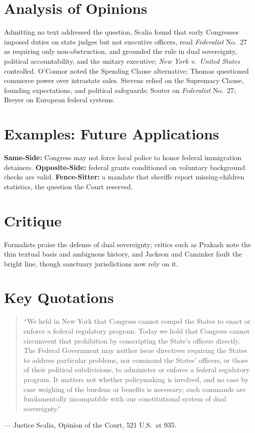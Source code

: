 \documentclass[12pt]{article}
\begin{document}
\section{Analysis of Opinions}
Admitting no text addressed the question, Scalia found that early Congresses imposed duties on state judges but not executive officers, read \textit{Federalist} No.\ 27 as requiring only non-obstruction, and grounded the rule in dual sovereignty, political accountability, and the unitary executive; \textit{New York v.\ United States} controlled. O'Connor noted the Spending Clause alternative; Thomas questioned commerce power over intrastate sales. Stevens relied on the Supremacy Clause, founding expectations, and political safeguards; Souter on \textit{Federalist} No.\ 27; Breyer on European federal systems.

\section{Examples: Future Applications}
\textbf{Same-Side:} Congress may not force local police to honor federal immigration detainers. \textbf{Opposite-Side:} federal grants conditioned on voluntary background checks are valid. \textbf{Fence-Sitter:} a mandate that sheriffs report missing-children statistics, the question the Court reserved.

\section{Critique}
Formalists praise the defense of dual sovereignty; critics such as Prakash note the thin textual basis and ambiguous history, and Jackson and Caminker fault the bright line, though sanctuary jurisdictions now rely on it.

\section{Key Quotations}
\begin{quote}
``We held in New York that Congress cannot compel the States to enact or enforce a federal regulatory program. Today we hold that Congress cannot circumvent that prohibition by conscripting the State's officers directly. The Federal Government may neither issue directives requiring the States to address particular problems, nor command the States' officers, or those of their political subdivisions, to administer or enforce a federal regulatory program. It matters not whether policymaking is involved, and no case by case weighing of the burdens or benefits is necessary; such commands are fundamentally incompatible with our constitutional system of dual sovereignty.''
\end{quote}
\noindent --- Justice Scalia, Opinion of the Court, 521 U.S.\ at 935.
\end{document}
